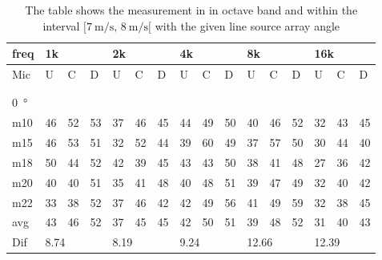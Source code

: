\begin{table}[H]
\centering
\caption{The table shows the measurement in in octave band and within the interval $[\SI{7}{\meter\per\second},\, \SI{8}{\meter\per\second}[ $ with the given line source array angle}
\begin{tabular}{l|l|l|l|l|l|l|l|l|l|l|l|l|lll}
freq & \multicolumn{3}{l|}{1k} & \multicolumn{3}{l|}{2k} & \multicolumn{3}{l|}{4k} & \multicolumn{3}{l|}{8k} & \multicolumn{3}{l}{16k}                                \\ \hline
Mic  & U      & C      & D     & U      & C      & D     & U      & C      & D     & U      & C      & D     & \multicolumn{1}{l|}{U}  & \multicolumn{1}{l|}{C}  & D  \\ \hline
 & \multicolumn{3}{l|}{} & \multicolumn{3}{l|}{} & \multicolumn{3}{l|}{} & \multicolumn{3}{l|}{} & \multicolumn{3}{l}{}                                \\ 
 \multicolumn{16}{l}{ } \\   
\SI{0}{\degree}   & \multicolumn{3}{l|}{} & \multicolumn{3}{l|}{} & \multicolumn{3}{l|}{} & \multicolumn{3}{l|}{} & \multicolumn{3}{l}{}   \\  \hline
m10  & 46     & 52     & 53    & 37     & 46     & 45    & 44     & 49     & 50    & 40     & 46     & 52    & \multicolumn{1}{l|}{32} & \multicolumn{1}{l|}{43} & 45 \\
m15  & 46     & 53     & 51    & 32     & 52     & 44    & 39     & 60     & 49    & 37     & 57     & 50    & \multicolumn{1}{l|}{30} & \multicolumn{1}{l|}{44} & 40 \\
m18  & 50     & 44     & 52    & 42     & 39     & 45    & 43     & 43     & 50    & 38     & 41     & 48    & \multicolumn{1}{l|}{27} & \multicolumn{1}{l|}{36} & 42 \\
m20  & 40     & 40     & 51    & 35     & 41     & 48    & 40     & 48     & 51    & 39     & 47     & 49    & \multicolumn{1}{l|}{32} & \multicolumn{1}{l|}{40} & 42 \\
m22  & 33     & 38     & 52    & 37     & 46     & 42    & 42     & 49     & 56    & 41     & 49     & 59    & \multicolumn{1}{l|}{32} & \multicolumn{1}{l|}{38} & 45 \\ \hline
avg  &  43     &  46   &  52    &  37    & 45     & 45    &  42    &  50    &  51   &  39    &  48    & 52    & \multicolumn{1}{l|}{31}   & \multicolumn{1}{l|}{40}   &  43 \\ \hline  
Dif & \multicolumn{3}{l|}{8.74} & \multicolumn{3}{l|}{8.19} & \multicolumn{3}{l|}{9.24} & \multicolumn{3}{l|}{12.66} & \multicolumn{3}{l}{12.39}  \\ 

\end{tabular}
\end{table}

